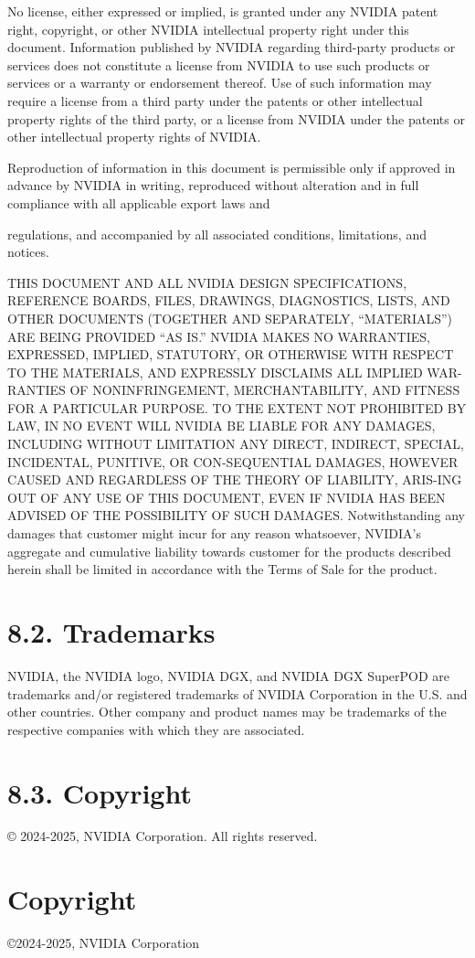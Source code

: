 \documentclass[
  10
]{article}
\begin{document}
No license, either expressed or implied, is granted under any NVIDIA
patent right, copyright, or other NVIDIA intellectual property right
under this document. Information published by NVIDIA regarding
third-party products or services does not constitute a license from
NVIDIA to use such products or services or a warranty or endorsement
thereof. Use of such information may require a license from a third
party under the patents or other intellectual property rights of the
third party, or a license from NVIDIA under the patents or other
intellectual property rights of NVIDIA.

Reproduction of information in this document is permissible only if
approved in advance by NVIDIA in writing, reproduced without alteration
and in full compliance with all applicable export laws and

regulations, and accompanied by all associated conditions, limitations,
and notices.

THIS DOCUMENT AND ALL NVIDIA DESIGN SPECIFICATIONS, REFERENCE BOARDS,
FILES, DRAWINGS, DIAGNOSTICS, LISTS, AND OTHER DOCUMENTS (TOGETHER AND
SEPARATELY, ``MATERIALS'') ARE BEING PROVIDED ``AS IS.'' NVIDIA MAKES NO
WARRANTIES, EXPRESSED, IMPLIED, STATUTORY, OR OTHERWISE WITH RESPECT TO
THE MATERIALS, AND EXPRESSLY DISCLAIMS ALL IMPLIED WAR-RANTIES OF
NONINFRINGEMENT, MERCHANTABILITY, AND FITNESS FOR A PARTICULAR PURPOSE.
TO THE EXTENT NOT PROHIBITED BY LAW, IN NO EVENT WILL NVIDIA BE LIABLE
FOR ANY DAMAGES, INCLUDING WITHOUT LIMITATION ANY DIRECT, INDIRECT,
SPECIAL, INCIDENTAL, PUNITIVE, OR CON-SEQUENTIAL DAMAGES, HOWEVER CAUSED
AND REGARDLESS OF THE THEORY OF LIABILITY, ARIS-ING OUT OF ANY USE OF
THIS DOCUMENT, EVEN IF NVIDIA HAS BEEN ADVISED OF THE POSSIBILITY OF
SUCH DAMAGES. Notwithstanding any damages that customer might incur for
any reason whatsoever, NVIDIA's aggregate and cumulative liability
towards customer for the products described herein shall be limited in
accordance with the Terms of Sale for the product.

\section{8.2. Trademarks}\label{trademarks}

NVIDIA, the NVIDIA logo, NVIDIA DGX, and NVIDIA DGX SuperPOD are
trademarks and/or registered trademarks of NVIDIA Corporation in the
U.S. and other countries. Other company and product names may be
trademarks of the respective companies with which they are associated.

\section{8.3. Copyright}\label{copyright}

© 2024-2025, NVIDIA Corporation. All rights reserved.

\section{Copyright}\label{copyright-1}

©2024-2025, NVIDIA Corporation
\end{document}

